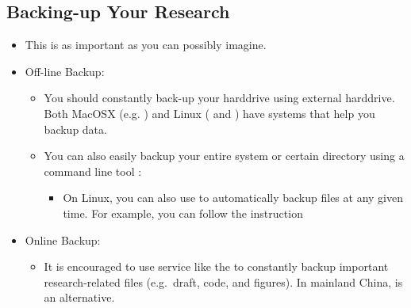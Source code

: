 \documentclass[letterpaper,10pt,english]{sphinxmanual}
\begin{document}
\subsection{Backing-up Your Research}
\label{\detokenize{resource/research/getting_started:backing-up-your-research}}\begin{itemize}
\item {} 
This is as important as you can possibly imagine.

\item {} 
Off-line Backup:
\begin{itemize}
\item {} 
You should constantly back-up your harddrive using external
harddrive. Both MacOSX (e.g.
) and
Linux ( and
) have systems that
help you backup data.

\item {} 
You can also easily backup your entire system or certain directory
using a command line tool
: 
\begin{itemize}
\item {} 
On Linux, you can also use
to automatically backup files at any given time. For example,
you can follow the instruction

\end{itemize}

\end{itemize}

\item {} 
Online Backup:
\begin{itemize}
\item {} 
It is encouraged to use service like the
 to constantly backup
important research-related files (e.g. draft, code, and figures).
In mainland China,  is an alternative.

\end{itemize}

\end{itemize}
\end{document}
